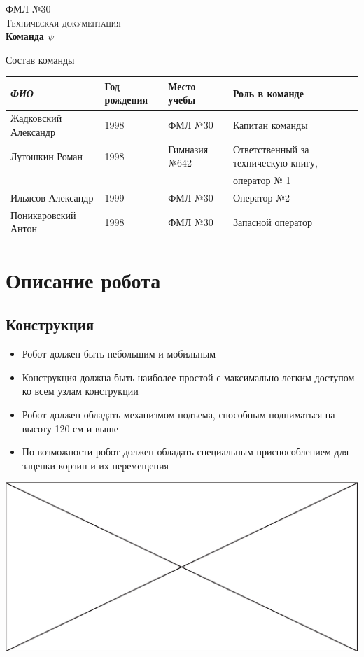 \documentclass[11pt]{article}
\newcommand\measurepage{\dimexpr\pagegoal-\pagetotal-\baselineskip\relax}
\newcommand\fillpage{\includegraphics[width=\textwidth, height=\measurepage]{img/fill_page.eps}}
\begin{document}
   \begin{titlepage}
      \begin{center}
           \textsc{\LARGE{ФМЛ №30}}\\[1.5cm]
	\textsc{\Large Техническая документация}\\[0.5cm]
	{ \huge \bfseries Команда $\psi$ \\[0.4cm] }
	      \end{center}
   \end{titlepage}
	\newpage
	
	\LARGE{Состав команды}
		\begin{table}[h]
			\begin{tabular}{|l|l|l|l|}
				\hline
				\textit{ФИО}         & Год рождения & Место учебы   & Роль в команде                      \\ \hline
				Жадковский Александр &  1998        & ФМЛ №30       & Капитан команды                     \\ \hline
				Лутошкин Роман       &  1998        & Гимназия №642 & Ответственный за техническую книгу, \\
				                     &              &               & оператор № 1                        \\ \hline
				Ильясов Александр    &  1999        & ФМЛ №30       & Оператор №2                         \\ \hline
				Поникаровский Антон  & 1998         & ФМЛ №30       & Запасной оператор                   \\ \hline
			\end{tabular}
		\end{table}
		\newpage
		
	\section{Описание робота}
		\subsection{Конструкция}
			\begin{itemize}
				\item Робот должен быть небольшим и мобильным
				\item Конструкция должна быть наиболее простой с максимально легким доступом ко всем узлам конструкции
				\item Робот должен обладать механизмом подъема, способным подниматься на высоту 120 см и выше
				\item По возможности робот должен обладать специальным приспособлением для зацепки корзин и их перемещения
			\end{itemize}
			\fillpage
			
\end{document}
